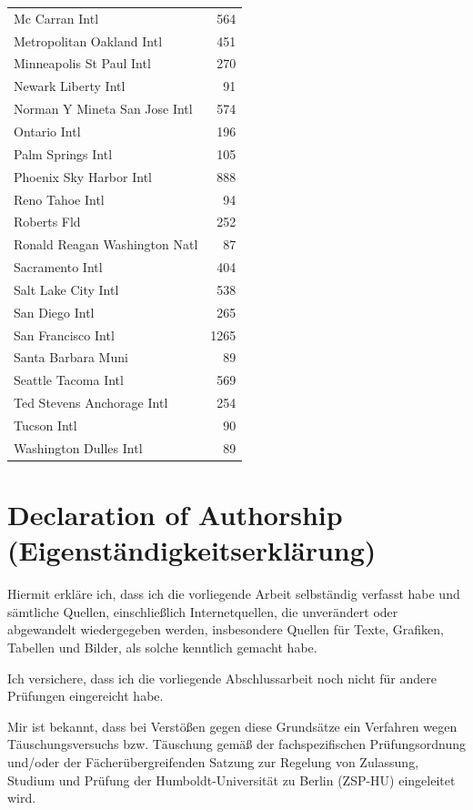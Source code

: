 \documentclass[12pt,twoside]{reedthesis}
\begin{document}
\begin{longtable}[t]{lr}
Mc Carran Intl & 564\\
Metropolitan Oakland Intl & 451\\
\addlinespace
Minneapolis St Paul Intl & 270\\
Newark Liberty Intl & 91\\
Norman Y Mineta San Jose Intl & 574\\
Ontario Intl & 196\\
Palm Springs Intl & 105\\
\addlinespace
Phoenix Sky Harbor Intl & 888\\
Reno Tahoe Intl & 94\\
Roberts Fld & 252\\
Ronald Reagan Washington Natl & 87\\
Sacramento Intl & 404\\
\addlinespace
Salt Lake City Intl & 538\\
San Diego Intl & 265\\
San Francisco Intl & 1265\\
Santa Barbara Muni & 89\\
Seattle Tacoma Intl & 569\\
\addlinespace
Ted Stevens Anchorage Intl & 254\\
Tucson Intl & 90\\
Washington Dulles Intl & 89\\*
\end{longtable}
\endgroup{}

\onehalfspacing

\hypertarget{declaration-of-authorship-eigenstuxe4ndigkeitserkluxe4rung}{%
\chapter*{Declaration of Authorship (Eigenständigkeitserklärung)}\label{declaration-of-authorship-eigenstuxe4ndigkeitserkluxe4rung}}

Hiermit erkläre ich, dass ich die vorliegende Arbeit selbständig verfasst habe und sämtliche Quellen, einschließlich Internetquellen, die unverändert oder abgewandelt wiedergegeben werden, insbesondere Quellen für Texte, Grafiken, Tabellen und Bilder, als solche kenntlich gemacht habe.

Ich versichere, dass ich die vorliegende Abschlussarbeit noch nicht für andere Prüfungen eingereicht habe.

Mir ist bekannt, dass bei Verstößen gegen diese Grundsätze ein Verfahren wegen Täuschungsversuchs bzw. Täuschung gemäß der fachspezifischen Prüfungsordnung und/oder der Fächerübergreifenden Satzung zur Regelung von Zulassung, Studium und Prüfung der Humboldt-Universität zu Berlin (ZSP-HU) eingeleitet wird.
\end{document}
